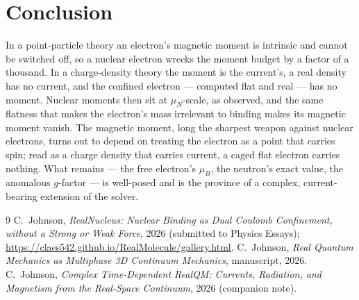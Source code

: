 \documentclass[11pt]{article}
\begin{document}
\section{Conclusion}
\label{sec:conclusion}

In a point-particle theory an electron's magnetic moment is intrinsic and cannot be switched off, so a
nuclear electron wrecks the moment budget by a factor of a thousand. In a charge-density theory the
moment is the current's, a real density has no current, and the confined electron --- computed flat and
real --- has no moment. Nuclear moments then sit at $\mu_N$-scale, as observed, and the same flatness
that makes the electron's mass irrelevant to binding makes its magnetic moment vanish. The magnetic
moment, long the sharpest weapon against nuclear electrons, turns out to depend on treating the electron
as a point that carries spin; read as a charge density that carries current, a caged flat electron
carries nothing. What remains --- the free electron's $\mu_B$, the neutron's exact value, the anomalous
$g$-factor --- is well-posed and is the province of a complex, current-bearing extension of the solver.

\begin{thebibliography}{9}
 C.~Johnson, \emph{RealNucleus: Nuclear Binding as Dual Coulomb Confinement, without
a Strong or Weak Force}, 2026 (submitted to Physics Essays);
\url{https://claes542.github.io/RealMolecule/gallery.html}.
 C.~Johnson, \emph{Real Quantum Mechanics as Multiphase 3D Continuum Mechanics},
manuscript, 2026.
 C.~Johnson, \emph{Complex Time-Dependent RealQM: Currents, Radiation, and
Magnetism from the Real-Space Continuum}, 2026 (companion note).
\end{thebibliography}
\end{document}
